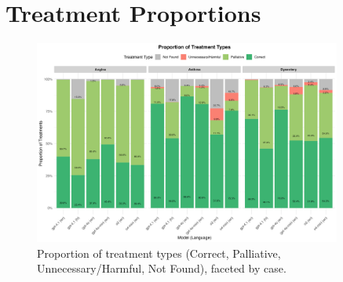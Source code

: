 \documentclass{article}
\begin{document}
\section{Treatment Proportions}
\begin{figure}[h!]
    \centering
    \includegraphics[width=0.9\textwidth]{figs/treatment_proportions_plot.png}
    \caption{Proportion of treatment types (Correct, Palliative, Unnecessary/Harmful, Not Found), faceted by case.}
    \label{fig:treatment_proportions}
\end{figure}
\end{document}
